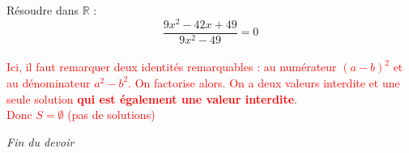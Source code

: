 \documentclass[12pt,a4paper]{exam}
\begin{document}
\begin{questions}

\question Résoudre dans $\mathbb{R}$ :
\[
\dfrac{9x^2-42x+49}{9x^2-49} = 0
\]
\textcolor{red}{
\\
\vspace{5pt}Ici, il faut remarquer deux identités remarquables : au numérateur $(a-b)^2$ et au 
dénominateur $a^2 - b^2$. On factorise alors. On a deux valeurs interdite et une seule solution 
\textbf{qui est également une valeur interdite}.
\\Donc $S = \emptyset$ (pas de solutions)}

\end{questions}

\vspace{10pt}

\begin{center}
    \textit{Fin du devoir}
\end{center}
\end{document}
